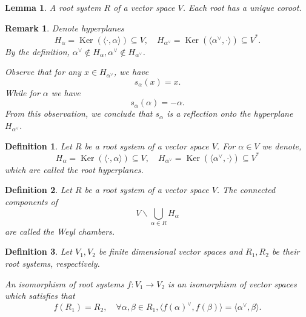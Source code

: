 \documentclass{article}
\newtheorem{definition}{Definition}[section]
\newtheorem{lemma}{Lemma}[section]
\newtheorem{remark}{Remark}[section]
\numberwithin{equation}{section}
\DeclareMathOperator{\Ker}{Ker}
\begin{document}
\begin{lemma}
A root system $R$ of a vector space $V$. Each root has a unique coroot.
\end{lemma}

\begin{remark}
Denote hyperplanes
\begin{equation*}
H_\alpha = \Ker(\langle \cdot,\alpha\rangle)\subseteq V, \quad H_{\alpha^\lor} = \Ker(\langle\alpha^\lor,\cdot\rangle)\subseteq V^*.
\end{equation*}
By the definition, $\alpha^\lor\not\in H_\alpha,\alpha^\lor\not\in H_{\alpha^\lor}$.\\
\par Observe that for any $x\in H_{\alpha^\lor}$, we have
\begin{equation*}
s_\alpha(x) = x.
\end{equation*}
While for $\alpha$ we have
\begin{equation*}
s_\alpha(\alpha) = -\alpha.
\end{equation*}
From this observation, we conclude that $s_\alpha$ is a reflection onto the hyperplane $H_{\alpha^\lor}$.
\end{remark}

\begin{definition}
Let $R$ be a root system of a vector space $V$. For $\alpha\in V$ we denote,
\begin{equation*}
H_\alpha = \Ker(\langle \cdot,\alpha\rangle)\subseteq V, \quad H_{\alpha^\lor} = \Ker(\langle\alpha^\lor,\cdot\rangle)\subseteq V^*
\end{equation*}
which are called the root hyperplanes.
\end{definition}

\begin{definition}
Let $R$ be a root system of a vector space $V$. The connected components of 
\begin{equation*}
V\backslash\bigcup_{\alpha\in R}H_\alpha
\end{equation*}
are called the Weyl chambers.
\end{definition}

\begin{definition}
Let $V_1,V_2$ be finite dimensional vector spaces and $R_1,R_2$ be their root systems, respectively.\\
\par An isomorphism of root systems $f:V_1\to V_2$ is an isomorphism of vector spaces which satisfies that 
\begin{equation*}
f(R_1) = R_2, \quad \forall \alpha,\beta\in R_1, \langle f(\alpha)^\lor,f(\beta)\rangle = \langle\alpha^\lor,\beta\rangle.%
\end{equation*}
\end{definition}
\end{document}
